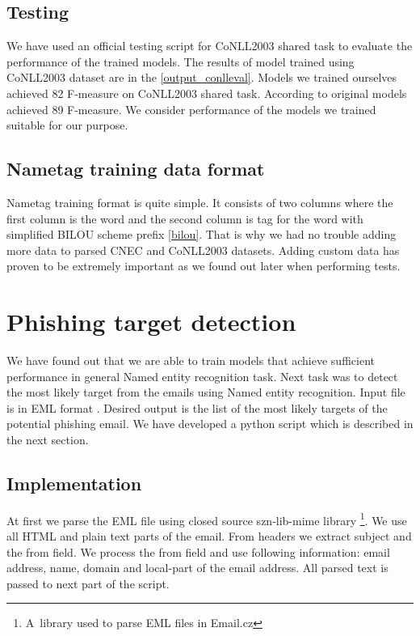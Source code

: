 \documentclass[thesis=B,english]{FITthesis}[2012/10/20]
\begin{document}

\subsection{Testing}
\par We have used an official testing script \cite{conlleval} for CoNLL2003 shared task to evaluate the performance of the trained models. The results of model trained using CoNLL2003 dataset are in the \ref{output_conlleval}. Models we trained ourselves achieved 82 F-measure on CoNLL2003 shared task. According to \cite{stateOfTheArtCzechNER} original models achieved 89 F-measure. We consider performance of the models we trained suitable for our purpose.



\subsection{Nametag training data format}
\par Nametag training format is quite simple. It consists of two columns where the first column is the word and the second column is tag for the word with simplified BILOU scheme prefix \ref{bilou}. That is why we had no trouble adding more data to parsed CNEC and CoNLL2003 datasets. Adding custom data has proven to be extremely important as we found out later when performing tests.

\section{Phishing target detection}
We have found out that we are able to train models that achieve sufficient performance in general Named entity recognition task. Next task was to detect the most likely target from the emails using Named entity recognition. Input file is in EML format \cite{emlRfc}. Desired output is the list of the most likely targets of the potential phishing email. We have developed a python script which is described in the next section.

\subsection{Implementation}
At first we parse the EML file using closed source szn-lib-mime library \footnote{A~library used to parse EML files in Email.cz}. We use all HTML and plain text parts of the email. From headers we extract subject and the from field. We process the from field and use following information: email address, name, domain and local-part of the email address. All parsed text is passed to next part of the script.
\end{document}

